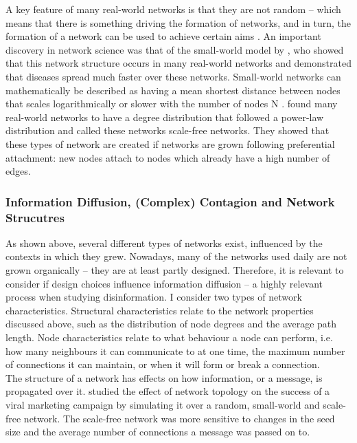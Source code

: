 A key feature of many real-world networks is that they are not random – which means that there is something driving the formation of networks, and in turn, the formation of a network can be used to achieve certain aims \citep{Newman2003}. An important discovery in network science was that of the small-world model by \cite{Watts1998}, who showed that this network structure occurs in many real-world networks and demonstrated that diseases spread much faster over these networks. Small-world networks can mathematically be described as having a mean shortest distance between nodes that scales logarithmically or slower with the number of nodes N \citep{Newman2003}. 
\cite{Barabasi1999} found many real-world networks to have a degree distribution that followed a power-law distribution and called these networks scale-free networks. They showed that these types of network are created if networks are grown following preferential attachment: new nodes attach to nodes which already have a high number of edges.


\subsubsection{Information Diffusion, (Complex) Contagion and Network Strucutres}
As shown above, several different types of networks exist, influenced by the contexts in which they grew. Nowadays, many of the networks used daily are not grown organically – they are at least partly designed. Therefore, it is relevant to consider if design choices influence information diffusion – a highly relevant process when studying disinformation. I consider two types of network characteristics. Structural characteristics relate to the network properties discussed above, such as the distribution of node degrees and the average path length. Node characteristics relate to what behaviour a node can perform, i.e. how many neighbours it can communicate to at one time, the maximum number of connections it can maintain, or when it will form or break a connection. \\

The structure of a network has effects on how information, or a message, is propagated over it. \cite{Bampo2008} studied the effect of network topology on the success of a viral marketing campaign by simulating it over a random, small-world and scale-free network. The scale-free network was more sensitive to changes in the seed size and the average number of connections a message was passed on to.  \\

